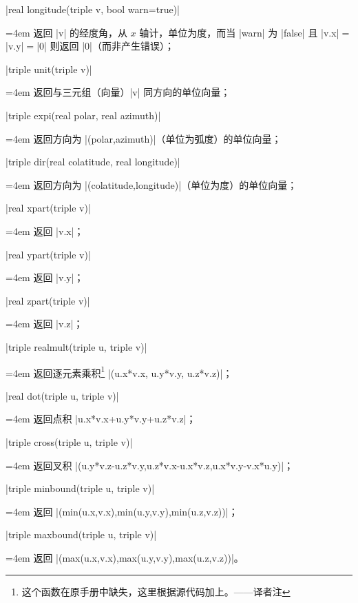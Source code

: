\documentclass{ctexbook}
\makeatletter
\newenvironment{funclist}{\trivlist
  \parindent=0pt
\item[]
  \def\item{\medskip\par\leftskip=0pt}
  \def\go{\par\leftskip=4em}}
{\endtrivlist}
\newenvironment{typelist}{\itemize
  \let\old@item\@item
  \def\@item[##1]{\expandafter\old@item[\ttfamily\color{type!50!black}##1]}}
{\enditemize}
\newcommand\transnote[1]{\footnote{#1——译者注}}
\makeatother
\begin{document}
\begin{typelist}
\begin{funclist}
\item |real longitude(triple v, bool warn=true)| \go
  返回 |v| 的经度角，从 $x$ 轴计，单位为度，而当 |warn| 为 |false| 且
  |v.x|${}={}$|v.y|${}={}$|0| 则返回 |0|（而非产生错误）；

\item |triple unit(triple v)| \go
  返回与三元组（向量）|v| 同方向的单位向量；

\item |triple expi(real polar, real azimuth)| \go
  返回方向为 |(polar,azimuth)|（单位为弧度）的单位向量；

\item |triple dir(real colatitude, real longitude)| \go
  返回方向为 |(colatitude,longitude)|（单位为度）的单位向量；

\item |real xpart(triple v)| \go
  返回 |v.x|；

\item |real ypart(triple v)| \go
  返回 |v.y|；

\item |real zpart(triple v)| \go
  返回 |v.z|；

\item |triple realmult(triple u, triple v)| \go
  返回逐元素乘积\transnote{这个函数在原手册中缺失，这里根据源代码加上。}
  |(u.x*v.x, u.y*v.y, u.z*v.z)|；

\item |real dot(triple u, triple v)| \go
  返回点积 |u.x*v.x+u.y*v.y+u.z*v.z|；

\item |triple cross(triple u, triple v)| \go
  返回叉积 |(u.y*v.z-u.z*v.y,u.z*v.x-u.x*v.z,u.x*v.y-v.x*u.y)|；

\item |triple minbound(triple u, triple v)| \go
  返回 |(min(u.x,v.x),min(u.y,v.y),min(u.z,v.z))|；

\item |triple maxbound(triple u, triple v)| \go
  返回 |(max(u.x,v.x),max(u.y,v.y),max(u.z,v.z))|。
\end{funclist}


\end{typelist}
\end{document}
